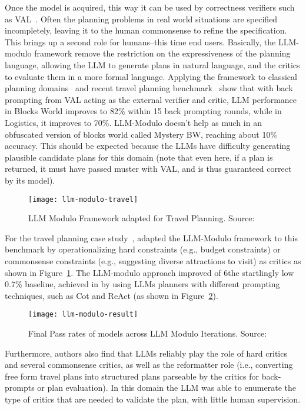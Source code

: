 Once the model is acquired, this way it can be used by correctness verifiers such as VAL~\cite{howey2004val, guan2023leveraging}.
Often the planning problems in real world situations are specified incompletely, leaving it to the human commonsense to refine the specification.
This brings up a second role for humans–this time end users.
Basically, the LLM-modulo framework remove the restriction on the expressiveness of the planning language, allowing the LLM to generate plans in natural language, and the critics to evaluate them in a more formal language.
Applying the framework to classical planning domains~\cite{valmeekam2023planning} and recent travel planning benchmark~\cite{gundawar2024robust} show that with back prompting from VAL acting as the external verifier and critic, LLM performance in Blocks World improves to 82\% within 15 back prompting rounds, while in Logistics, it improves to 70\%.
LLM-Modulo doesn’t help as much in an obfuscated version of blocks world called Mystery BW, reaching about 10\% accuracy.
This should be expected because the LLMs have difficulty generating plausible candidate plans for this domain (note that even here, if a plan is returned, it must have passed muster with VAL, and is thus guaranteed correct by its model).
\begin{figure}[h!]
	\centering
	\texttt{[image: llm-modulo-travel]}
	\caption{LLM Modulo Framework adapted for Travel Planning. Source: \textcite{kambhampati2024llmscantplanhelp}}
	\label{fig:llm-modulo-travel}
\end{figure}
For the travel planning case study~\cite{gundawar2024robust}, \textcite{kambhampati2024llmscantplanhelp} adapted the LLM-Modulo framework to this benchmark by operationalizing hard constraints (e.g., budget constraints) or commonsense constraints (e.g., suggesting diverse attractions to visit) as critics as shown in Figure~\ref{fig:llm-modulo-travel}.
The LLM-modulo approach improved of 6\texttimes the startlingly low 0.7\% baseline, achieved in \textcite{gundawar2024robust} by using LLMs planners with different prompting techniques, such as Cot and ReAct (as shown in Figure~\ref{fig:llm-modulo-travel-results}).
\begin{figure}
	\centering
	\texttt{[image: llm-modulo-result]}
	\caption{Final Pass rates of models across LLM Modulo Iterations. Source: \textcite{kambhampati2024llmscantplanhelp}}
	\label{fig:llm-modulo-travel-results}
\end{figure}
Furthermore, authors also find that LLMs reliably play the role of hard critics and several commonsense critics, as well as the reformatter role (i.e., converting free form travel plans into structured plans parseable by the critics for back-prompts or plan evaluation).
In this domain the LLM was able to enumerate the type of critics that are needed to validate the plan, with little human supervision.